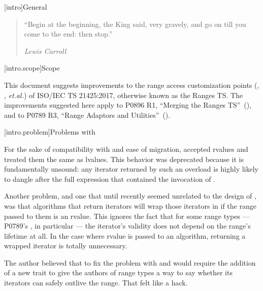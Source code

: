 [intro]{General}

\begin{quote}
``Begin at the beginning, the King said, very gravely, and go on till you come to the end: then stop.''
\begin{flushright}
\textemdash \textit{Lewis Carroll}
\end{flushright}
\end{quote}

[intro.scope]{Scope}

\pnum
This document suggests improvements to the range access customization points
(, , \textit{et.al.}) of ISO/IEC TS 21425:2017, otherwise
known as the Ranges TS. The improvements suggested here apply to P0896 R1,
``Merging the Ranges TS''~(\cite{P0896}), and to P0789 R3, ``Range Adaptors and
Utilities''~(\cite{P0789}).

[intro.problem]{Problems with }

\pnum
For the sake of compatibility with  and ease of migration,
 accepted rvalues and treated them the
same as  lvalues. This behavior was deprecated because it is
fundamentally unsound: any iterator returned by such an overload is highly
likely to dangle after the full expression that contained the invocation of
.

\pnum
Another problem, and one that until recently seemed unrelated to the design of
, was that algorithms that return iterators will wrap those
iterators in  if the range passed
to them is an rvalue. This ignores the fact that for some range types ---
 P0789's ,
in particular --- the iterator's validity does not
depend on the range's lifetime at all. In the case where rvalue
 is passed to an algorithm,
returning a wrapped iterator is totally unnecessary.

\pnum
The author believed that to fix the problem with  and
 would require the addition of a new trait to give the authors
of range types a way to say whether its iterators can safely outlive the range.
That felt like a hack.

